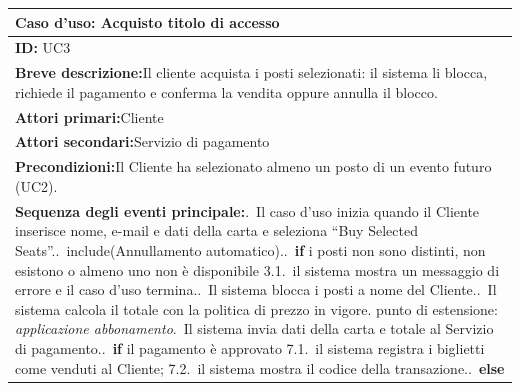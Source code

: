 \begin{center}
\small
\begin{tabular}{|p{}|}
\hline
\textbf{Caso d'uso: Acquisto titolo di accesso} \\ \hline
\textbf{ID:} UC3 \\ \hline
\textbf{Breve descrizione:}\newline Il cliente acquista i posti selezionati: il sistema li blocca, richiede il pagamento e conferma la vendita oppure annulla il blocco. \\ \hline
\textbf{Attori primari:}\newline Cliente \\ \hline
\textbf{Attori secondari:}\newline Servizio di pagamento \\ \hline
\textbf{Precondizioni:}\newline Il Cliente ha selezionato almeno un posto di un evento futuro (UC2). \\ \hline
\textbf{Sequenza degli eventi principale:}\newline 1.~Il caso d'uso inizia quando il Cliente inserisce nome, e-mail e dati della carta e seleziona ``Buy Selected Seats''.\newline
2.~include(Annullamento automatico).\newline
3.~\textbf{if} i posti non sono distinti, non esistono o almeno uno non è disponibile\newline
\hspace*{1em}3.1.~il sistema mostra un messaggio di errore e il caso d'uso termina.\newline
4.~Il sistema blocca i posti a nome del Cliente.\newline
5.~Il sistema calcola il totale con la politica di prezzo in vigore.\newline
\hspace*{1em}punto di estensione: \emph{applicazione abbonamento}\newline
6.~Il sistema invia dati della carta e totale al Servizio di pagamento.\newline
7.~\textbf{if} il pagamento è approvato\newline
\hspace*{1em}7.1.~il sistema registra i biglietti come venduti al Cliente;\newline
\hspace*{1em}7.2.~il sistema mostra il codice della transazione.\newline
8.~\textbf{else}\newline

\end{tabular}
\end{center}
